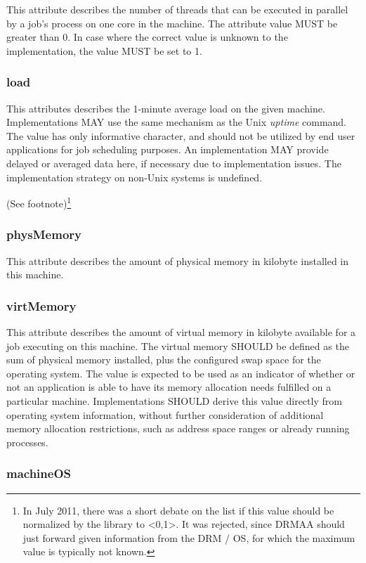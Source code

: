 \documentclass{article}
\newcommand{\rat}[1]{ {\tiny(See footnote)}\footnote{#1} }
\begin{document}
This attribute describes the number of threads that can be executed in parallel by a job's process on one core in the machine. The attribute value MUST be greater than 0. In case where the correct value is unknown to the implementation, the value MUST be set to 1.

\subsubsection{load}

This attributes describes the 1-minute average load on the given machine. Implementations MAY use the same mechanism as the Unix \emph{uptime} command. The value has only informative character, and should not be utilized by end user applications for job scheduling purposes. An implementation MAY provide delayed or averaged data here, if necessary due to implementation issues. The implementation strategy on non-Unix systems is undefined.

\rat{In July 2011, there was a short debate on the list if this value should be normalized by the library to <0,1>. It was rejected, since DRMAA should just forward given information from the DRM / OS, for which the maximum value is typically not known. }

\subsubsection{physMemory}

This attribute describes the amount of physical memory in kilobyte installed in this machine.

\subsubsection{virtMemory}

This attribute describes the amount of virtual memory in kilobyte available for a job executing on this machine. The virtual memory SHOULD be defined as the sum of physical memory installed, plus the configured swap space for the operating system. The value is expected to be used as an indicator of whether or not an application is able to have its memory allocation needs fulfilled on a particular machine. Implementations SHOULD derive this value directly from operating system information, without further consideration of additional memory allocation restrictions, such as address space ranges or already running processes. 

\subsubsection{machineOS}
\end{document}
